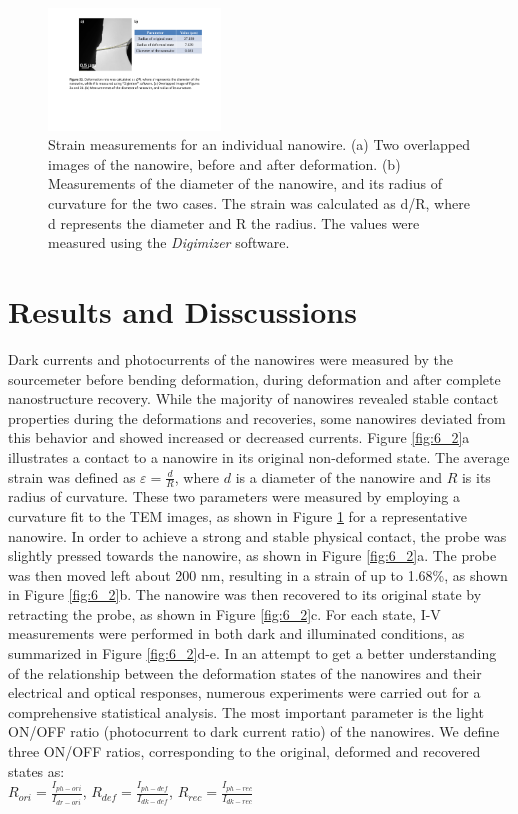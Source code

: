 \begin{figure}  
\includegraphics[width=130pt,angle=-90]{figures/figure6_s2}
\caption[Strain value]
{Strain measurements for an individual nanowire. (a) Two overlapped images of the nanowire, before and after deformation. (b) Measurements of the diameter of the nanowire, and its radius of curvature for the two cases. The strain was calculated as d/R, where d represents the diameter and R the radius. The values were measured using the {\em Digimizer} software.
\label{fig:6_s2}}
\end{figure}

\section{Results and Disscussions}
Dark currents and photocurrents of the nanowires were measured by the sourcemeter before bending deformation, during deformation and after complete nanostructure recovery. While the majority of nanowires revealed stable contact properties during the deformations and recoveries, some nanowires deviated from this behavior and showed increased or decreased currents. Figure \ref{fig:6_2}a illustrates a contact to a nanowire in its original non-deformed state. The average strain was defined as $\varepsilon = \frac{d}{R}$, where $d$ is a diameter of the nanowire and $R$ is its radius of curvature. These two parameters were measured by employing a curvature fit to the TEM images, as shown in Figure \ref{fig:6_s2} for a representative nanowire. In order to achieve a strong and stable physical contact, the probe was slightly pressed towards the nanowire, as shown in Figure \ref{fig:6_2}a. The probe was then moved left about 200 nm, resulting in a strain of up to 1.68\%, as shown in Figure \ref{fig:6_2}b. The nanowire was then recovered to its original state by retracting the probe, as shown in Figure \ref{fig:6_2}c. For each state, I-V measurements were performed in both dark and illuminated conditions, as summarized in Figure \ref{fig:6_2}d-e. In an attempt to get a better understanding of the relationship between the deformation states of the nanowires and their electrical and optical responses, numerous experiments were carried out for a comprehensive statistical analysis. The most important parameter is the light ON/OFF ratio (photocurrent to dark current ratio) of the nanowires. We define three ON/OFF ratios, corresponding to the original, deformed and recovered states as:\\
{\center
$R_{ori} = \frac{I_{ph-ori}}{I_{dr-ori}}$, $R_{def} = \frac{I_{ph-def}}{I_{dk-def}}$, $R_{rec} = \frac{I_{ph-rec}}{I_{dk-rec}}$\\}

